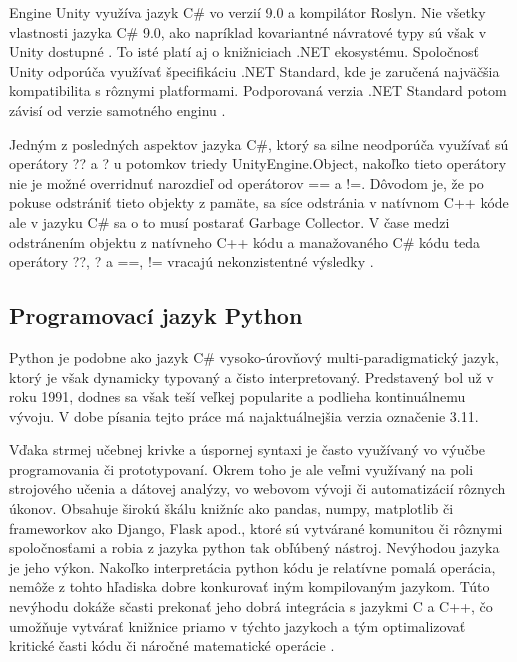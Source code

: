 \documentclass[slovak, master]{diploma}
\begin{document}
Engine Unity využíva jazyk C\# vo verzií 9.0 a kompilátor Roslyn. Nie všetky vlastnosti jazyka C\# 9.0, ako napríklad kovariantné návratové typy sú však v Unity dostupné \cite{compiler}. To isté platí aj o knižniciach .NET ekosystému. Spoločnosť Unity odporúča využívať špecifikáciu .NET Standard, kde je zaručená najväčšia kompatibilita s rôznymi platformami. Podporovaná verzia .NET Standard potom závisí od verzie samotného enginu \cite{netUnity}. 

Jedným z posledných aspektov jazyka C\#, ktorý sa silne neodporúča využívať sú operátory ?? a ? u potomkov triedy UnityEngine.Object, nakoľko tieto operátory nie je možné overridnuť narozdieľ od operátorov == a !=. Dôvodom je, že po pokuse odstrániť tieto objekty z pamäte, sa síce odstránia v natívnom C++ kóde ale v jazyku C\# sa o to musí postarať Garbage Collector. V čase medzi odstránením objektu z natívneho C++ kódu a manažovaného C\# kódu teda operátory ??, ? a ==, != vracajú nekonzistentné výsledky \cite{netUnity}.

\subsection{Programovací jazyk Python}
\label{sec:langsPython}
Python je podobne ako jazyk C\# vysoko-úrovňový multi-paradigmatický jazyk, ktorý je však dynamicky typovaný a čisto interpretovaný. Predstavený bol už v roku 1991, dodnes sa však teší veľkej popularite a podlieha kontinuálnemu vývoju. V dobe písania tejto práce má najaktuálnejšia verzia označenie 3.11. 

Vďaka strmej učebnej krivke a úspornej syntaxi je často využívaný vo výučbe programovania či prototypovaní. Okrem toho je ale veľmi využívaný na poli strojového učenia a dátovej analýzy, vo webovom vývoji či automatizácií rôznych úkonov. Obsahuje širokú škálu knižníc ako pandas, numpy, matplotlib či frameworkov ako Django, Flask apod., ktoré sú vytvárané komunitou či rôznymi spoločnosťami a robia z jazyka python tak obľúbený nástroj. Nevýhodou jazyka je jeho výkon. Nakoľko interpretácia python kódu je relatívne pomalá operácia, nemôže z tohto hľadiska dobre konkurovať iným kompilovaným jazykom. Túto nevýhodu dokáže sčasti prekonať jeho dobrá integrácia s jazykmi C a C++, čo umožňuje vytvárať knižnice priamo v týchto jazykoch a tým optimalizovať kritické časti kódu či náročné matematické operácie \cite{pajton}.
\end{document}
